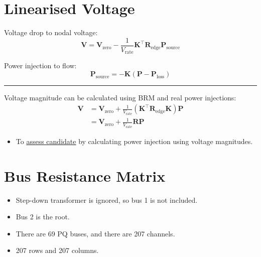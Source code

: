 \documentclass[
]{book}
\providecommand{\tightlist}{%
  \setlength{\itemsep}{0pt}\setlength{\parskip}{0pt}}
\begin{document}
\hypertarget{linearised-voltage}{%
\section{Linearised Voltage}\label{linearised-voltage}}

Voltage drop to nodal voltage:
\[
\boldsymbol{V}
  = \boldsymbol{V}_\text{zero}
  - \frac{1}{V_\text{rate}} \boldsymbol{K}^{\top}
  \boldsymbol{R}_\text{edge} \boldsymbol{P}_\text{source}
\]

Power injection to flow:
\[
\boldsymbol{P}_\text{source}
  = - \boldsymbol{K}
  \left(\boldsymbol{P} - \boldsymbol{P}_\text{loss} \right)
\]

\begin{center}\rule{0.5\linewidth}{0.5pt}\end{center}

Voltage magnitude can be calculated using BRM and real power injections:
\[ \begin{aligned}
  \boldsymbol{V} &= \boldsymbol{V}_\text{zero} + \frac{1}{V_\text{rate}}
    \left(
      \boldsymbol{K}^{\top} \boldsymbol{R}_\text{edge} \boldsymbol{K}
    \right) \boldsymbol{P} \\
  {} &= \boldsymbol{V}_\text{zero}
      + \frac{1}{V_\text{rate}} \boldsymbol{R} \boldsymbol{P}
\end{aligned} \]

\begin{itemize}
\tightlist
\item
  To \protect\hyperlink{assessment}{assess candidate} by calculating power injection using
  voltage magnitudes.
\end{itemize}

\hypertarget{BRM}{%
\section{Bus Resistance Matrix}\label{BRM}}

\begin{itemize}
\tightlist
\item
  Step-down transformer is ignored, so bus 1 is not included.
\item
  Bus 2 is the root.
\item
  There are 69 PQ buses, and there are 207 channels.
\item
  207 rows and 207 columns.
\end{itemize}
\end{document}
